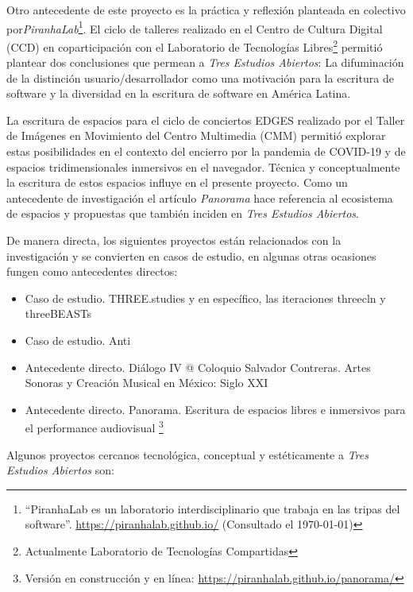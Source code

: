 Otro antecedente de este proyecto es la práctica y reflexión planteada en colectivo por\textit{PiranhaLab}\footnote{``PiranhaLab es un laboratorio interdisciplinario que trabaja en las tripas del software''. \url{https://piranhalab.github.io/} (Consultado el \today)}. El ciclo de talleres realizado en el Centro de Cultura Digital (CCD) en coparticipación con el Laboratorio de Tecnologías Libres\footnote{Actualmente Laboratorio de Tecnologías Compartidas} permitió plantear dos conclusiones que permean a \textit{Tres Estudios Abiertos}: La difuminación de la distinción usuario/desarrollador como una motivación para la escritura de software y la diversidad en la escritura de software en América Latina.

La escritura de espacios para el ciclo de conciertos EDGES realizado por el Taller de Imágenes en Movimiento del Centro Multimedia (CMM) permitió explorar estas posibilidades en el contexto del encierro por la pandemia de COVID-19 y de espacios tridimensionales inmersivos en el navegador. Técnica y conceptualmente la escritura de estos espacios influye en el presente proyecto. Como un antecedente de investigación el artículo \textit{Panorama} \citep{panoramaArticulo} hace referencia al ecosistema de espacios y propuestas que también inciden en \textit{Tres Estudios Abiertos}.

De manera directa, los siguientes proyectos están relacionados con la investigación y se convierten en casos de estudio, en algunas otras ocasiones fungen como antecedentes directos:

\begin{itemize}

\item Caso de estudio. THREE.studies \citep{threestudies} y en específico, las iteraciones threecln \citep{threecln} y threeBEASTs \citep{threeBEASTs}
\item Caso de estudio. Anti \citep{anti} 
\item Antecedente directo. Diálogo IV @ Coloquio Salvador Contreras. Artes Sonoras y Creación Musical en México: Siglo XXI \citep{dialogo}
\item Antecedente directo. Panorama. Escritura de espacios libres e inmersivos para el performance audiovisual \citep{panoramaArticulo}\footnote{Versión en construcción y en línea: \url{https://piranhalab.github.io/panorama/}}
  
\end{itemize}


Algunos proyectos cercanos tecnológica, conceptual y estéticamente a \textit{Tres Estudios Abiertos} son: 

